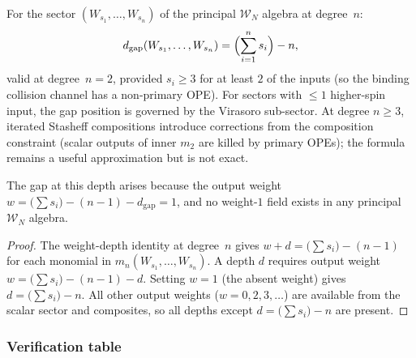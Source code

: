 \begin{proposition}
\label{prop:universal-sector-gap}
%
For the sector $(W_{s_1}, \ldots, W_{s_n})$ of the
principal $\mathcal{W}_N$ algebra at degree~$n$:
\begin{equation}
\label{eq:sector-gap-formula}
d_{\mathrm{gap}}(W_{s_1}, \ldots, W_{s_n})
= \Bigl(\sum_{i=1}^n s_i\Bigr) - n,
\end{equation}
valid at degree~$n = 2$, provided $s_i \ge 3$ for at
least $2$ of the inputs \textup{(}so the binding
collision channel has a non-primary
OPE\textup{)}. For sectors with $\le 1$ higher-spin
input, the gap position is governed by the Virasoro
sub-sector. At degree $n \ge 3$, iterated Stasheff
compositions introduce corrections from the
composition constraint
\textup{(}scalar outputs of inner $m_2$ are killed by
primary OPEs\textup{)}; the formula remains a useful
approximation but is not exact.

The gap at this depth arises because the output weight
$w = \bigl(\sum s_i\bigr) - (n-1) - d_{\mathrm{gap}}
= 1$,
and no weight-$1$ field exists in any principal
$\mathcal{W}_N$ algebra.
\end{proposition}

\begin{proof}
The weight-depth identity at degree~$n$ gives
$w + d = \bigl(\sum s_i\bigr) - (n - 1)$ for each
monomial in $m_n(W_{s_1}, \ldots, W_{s_n})$. A depth
$d$ requires output weight $w = \bigl(\sum s_i\bigr) - (n-1) - d$.
Setting $w = 1$ (the absent weight) gives
$d = \bigl(\sum s_i\bigr) - n$.
All other output weights ($w = 0, 2, 3, \ldots$)
are available from the scalar sector and composites,
so all depths except $d = \bigl(\sum s_i\bigr) - n$
are present.
\end{proof}

\subsubsection{Verification table}

